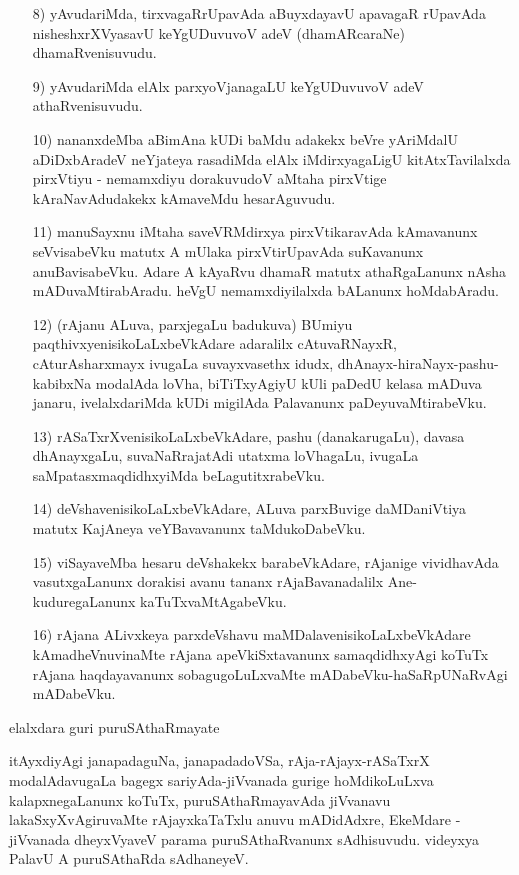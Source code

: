 \begin{itemize}
\item [8)] yAvudariMda, tirxvagaRrUpavAda aBuyxdayavU apavagaR rUpavAda nisheshxrXVyasavU keYgUDuvuvoV adeV (dhamARcaraNe) dhamaRvenisuvudu.
\item [9)] yAvudariMda elAlx parxyoVjanagaLU keYgUDuvuvoV adeV athaRvenisuvudu.
\item [10)] nananxdeMba aBimAna kUDi baMdu adakekx beVre yAriMdalU aDiDxbAradeV neYjateya rasadiMda elAlx iMdirxyagaLigU kitAtxTavilalxda pirxVtiyu - nemamxdiyu dorakuvudoV aMtaha pirxVtige kAraNavAdudakekx kAmaveMdu hesarAguvudu. 
\item [11)] manuSayxnu iMtaha saveVRMdirxya pirxVtikaravAda kAmavanunx seVvisabeVku matutx A mUlaka pirxVtirUpavAda suKavanunx anuBavisabeVku. Adare A kAyaRvu dhamaR matutx athaRgaLanunx nAsha mADuvaMtirabAradu. heVgU nemamxdiyilalxda bALanunx hoMdabAradu.
\item [12)] (rAjanu ALuva, parxjegaLu badukuva) BUmiyu paqthivxyenisikoLaLxbeVkAdare adaralilx cAtuvaRNayxR, cAturAsharxmayx ivugaLa suvayxvasethx idudx, dhAnayx-hiraNayx-pashu-kabibxNa modalAda loVha, biTiTxyAgiyU kUli paDedU kelasa mADuva janaru, ivelalxdariMda kUDi migilAda Palavanunx paDeyuvaMtirabeVku.
\item [13)] rASaTxrXvenisikoLaLxbeVkAdare, pashu (danakarugaLu), davasa dhAnayxgaLu, suvaNaRrajatAdi utatxma loVhagaLu, ivugaLa saMpatasxmaqdidhxyiMda beLagutitxrabeVku.
\item [14)] deVshavenisikoLaLxbeVkAdare, ALuva parxBuvige daMDaniVtiya matutx KajAneya veYBavavanunx taMdukoDabeVku.
\item [15)] viSayaveMba hesaru deVshakekx barabeVkAdare, rAjanige vividhavAda vasutxgaLanunx dorakisi avanu tananx rAjaBavanadalilx Ane-kuduregaLanunx kaTuTxvaMtAgabeVku.
\item [16)] rAjana ALivxkeya parxdeVshavu maMDalavenisikoLaLxbeVkAdare kAmadheVnuvinaMte rAjana apeVkiSxtavanunx samaqdidhxyAgi koTuTx rAjana haqdayavanunx sobagugoLuLxvaMte mADabeVku-haSaRpUNaRvAgi mADabeVku.
\end{itemize}

elalxdara guri puruSAthaRmayate

itAyxdiyAgi janapadaguNa, janapadadoVSa, rAja-rAjayx-rASaTxrX modalAdavugaLa bagegx sariyAda-jiVvanada gurige hoMdikoLuLxva kalapxnegaLanunx koTuTx, puruSAthaRmayavAda jiVvanavu lakaSxyXvAgiruvaMte rAjayxkaTaTxlu anuvu mADidAdxre, EkeMdare - jiVvanada dheyxVyaveV parama puruSAthaRvanunx sAdhisuvudu. videyxya PalavU A puruSAthaRda sAdhaneyeV.

